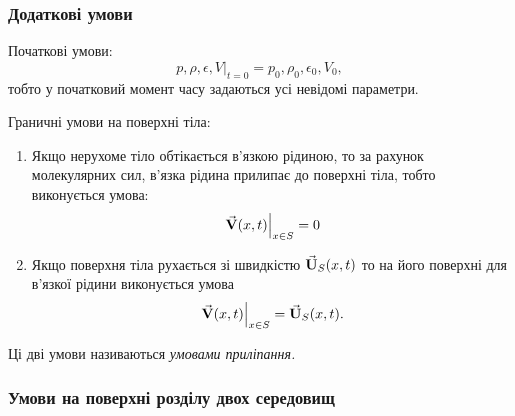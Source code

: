\subsubsection{Додаткові умови}

Початкові умови:
\begin{equation}
	\left. p, \rho, \epsilon, V \right|_{t = 0} = p_0, \rho_0, \epsilon_0, V_0,
\end{equation}
тобто у початковий момент часу задаються усі невідомі параметри. \medskip

Граничні умови на поверхні тіла:
\begin{enumerate}
	\item Якщо нерухоме тіло обтікається в'язкою рідиною, то за рахунок молекулярних сил, в'язка рідина прилипає до поверхні тіла, тобто виконується умова:
	\begin{equation}
		\left. {\vec{\mathbf{V}}}(x, t) \right|_{x \in S} = 0
	\end{equation}
	\item Якщо поверхня тіла рухається зі швидкістю  ${\vec{\mathbf{U}}}_S(x, t)$ то на його поверхні для в'язкої рідини виконується умова
	\begin{equation}
		\left. {\vec{\mathbf{V}}}(x, t) \right|_{x \in S} = {\vec{\mathbf{U}}}_S(x, t).
	\end{equation}
\end{enumerate}

\begin{definition}
	Ці дві умови називаються \it{умовами приліпання}.
\end{definition}

\subsubsection{Умови на поверхні розділу двох середовищ}

